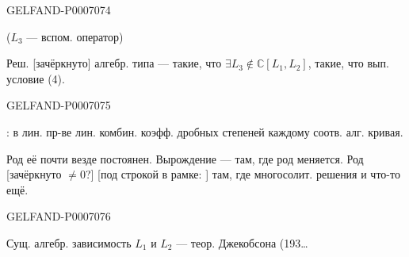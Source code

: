 \begin{GelfandAdjacentEvidence}{GELFAND-P000707}{4}

(\(L_3\) --- вспом. оператор)

Реш. [зачёркнуто] алгебр. типа --- такие, что
\(\exists L_3\notin\mathbb C[L_1,L_2]\), такие, что вып. условие (4).
\end{GelfandAdjacentEvidence}
\begin{GelfandAdjacentEvidence}{GELFAND-P000707}{5}


: в лин. пр-ве лин. комбин. коэфф. дробных степеней каждому соотв. алг. кривая.

Род её почти везде постоянен. Вырождение --- там, где род меняется.
Род [зачёркнуто \(\ne 0\)?] [под строкой в рамке: ]
там, где многосолит. решения и что-то ещё.
\end{GelfandAdjacentEvidence}
\begin{GelfandAdjacentEvidence}{GELFAND-P000707}{6}


Сущ. алгебр. зависимость \(L_1\) и \(L_2\) --- теор. Джекобсона (193…
\end{GelfandAdjacentEvidence}



